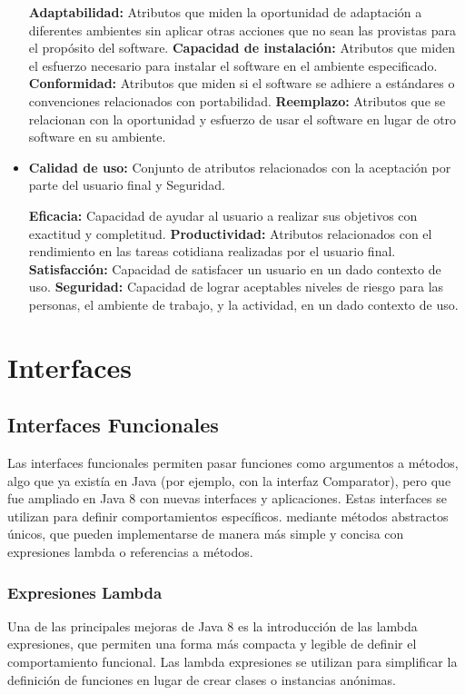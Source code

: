 \begin{center}
\begin{itemize}
		      \subitem \textbf{ Adaptabilidad: } Atributos que miden la oportunidad de
		      adaptación a diferentes ambientes sin aplicar otras
		      acciones que no sean las provistas para el propósito del
		      software.
		      \subitem \textbf{Capacidad de instalación: } Atributos que miden el
		      esfuerzo necesario para instalar el software en el
		      ambiente especificado.
		      \subitem \textbf{Conformidad: } Atributos que miden si el software se
		      adhiere a estándares o convenciones relacionados con
		      portabilidad.
		      \subitem \textbf{Reemplazo: }Atributos que se relacionan con la
		      oportunidad y esfuerzo de usar el software en lugar de
		      otro software en su ambiente.

		\item \textbf{Calidad de uso:} Conjunto de atributos
		      relacionados con la aceptación por parte del
		      usuario final y Seguridad.

		      \subitem \textbf{Eficacia: } Capacidad de ayudar al usuario a realizar sus
		      objetivos con exactitud y completitud.
		      \subitem \textbf{Productividad: }Atributos relacionados con el rendimiento
		      en las tareas cotidiana realizadas por el usuario final.
		      \subitem \textbf{Satisfacción: }Capacidad de satisfacer un usuario en un
		      dado contexto de uso.
		      \subitem \textbf{Seguridad: }Capacidad de lograr aceptables niveles de
		      riesgo para las personas, el ambiente de trabajo, y la
		      actividad, en un dado contexto de uso.

	\end{itemize}

	\section{Interfaces}
	\subsection{Interfaces Funcionales}
	Las interfaces funcionales permiten pasar funciones como argumentos a métodos,
	algo que ya existía en Java (por ejemplo, con la interfaz Comparator),
	pero que fue ampliado en Java 8 con nuevas interfaces y aplicaciones.
	Estas interfaces se utilizan para definir comportamientos específicos.
	mediante métodos abstractos únicos, que pueden implementarse de manera más simple
	y concisa con expresiones lambda o referencias a métodos.
	\subsubsection{Expresiones Lambda}
	Una de las principales mejoras de Java 8 es la introducción de las lambda
	expresiones, que permiten una forma más compacta y legible de definir el
	comportamiento funcional. Las lambda expresiones se utilizan para simplificar
	la definición de funciones en lugar de crear clases o instancias anónimas.

\end{center}
